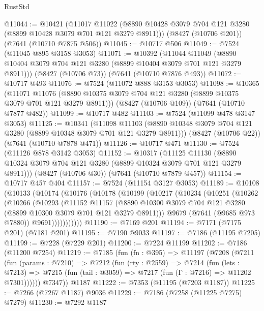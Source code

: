 \begin{lexlean}{RustStd}
\begin{coremodule}
{\begin{coremodule}
{{{{{{{{{{{{{{{{{{{{{{{{{{{{{{{{@11044 := @10421
    (@11017 @11022 (@8890 @10428 @3079 @704 @121 @3280 (@8899 @10428 @3079 @701 @121 @3279 @8911)))
    (@8427 (@10706 @201))
    (@7641 (@10710 @7875 @506))
@11045 := @10717 @506
@11049 := @7524 (@11045 @895 @3158 @3053)
@11071 := @10392
    (@11044 @11049 (@8890 @10404 @3079 @704 @121 @3280 (@8899 @10404 @3079 @701 @121 @3279 @8911)))
    (@8427 (@10706 @73))
    (@7641 (@10710 @7876 @493))
@11072 := @10717 @493
@11076 := @7524 (@11072 @888 @3153 @3053)
@11098 := @10365
    (@11071 @11076 (@8890 @10375 @3079 @704 @121 @3280 (@8899 @10375 @3079 @701 @121 @3279 @8911)))
    (@8427 (@10706 @109))
    (@7641 (@10710 @7877 @482))
@11099 := @10717 @482
@11103 := @7524 (@11099 @478 @3147 @3053)
@11125 := @10341
    (@11098 @11103 (@8890 @10348 @3079 @704 @121 @3280 (@8899 @10348 @3079 @701 @121 @3279 @8911)))
    (@8427 (@10706 @22))
    (@7641 (@10710 @7878 @471))
@11126 := @10717 @471
@11130 := @7524 (@11126 @878 @3142 @3053)
@11152 := @10317
    (@11125 @11130 (@8890 @10324 @3079 @704 @121 @3280 (@8899 @10324 @3079 @701 @121 @3279 @8911)))
    (@8427 (@10706 @30))
    (@7641 (@10710 @7879 @457))
@11154 := @10717 @457 @404
@11157 := @7524 (@11154 @3127 @3053)
@11189 := @10108
    (@10133
      (@10174
        (@10176
          (@10178
            (@10199
              (@10217
                (@10234
                  (@10251
                    (@10262
                      (@10266
                        (@10293
                          (@11152
                            @11157
                            (@8890
                              @10300
                              @3079
                              @704
                              @121
                              @3280
                              (@8899 @10300 @3079 @701 @121 @3279 @8911)))
                          @9679
                          (@7641 (@9685 @973 @7880))
                          @9691)))))))))))
@11190 := @7169 @201
@11194 := @7171 (@7175 @201) (@7181 @201)
@11195 := @7190 @9033
@11197 := @7186 (@11195 @7205)
@11199 := @7228 (@7229 @201)
@11200 := @7224 @11199
@11202 := @7186 (@11200 @7254)
@11219 := @7185
    (fun (fn : @395) =>
    @11197
      (@7208
        (@7211
          (fun (params : @7210) =>
          @7212
            (fun (rty : @2559) =>
            @7214
              (fun (lets : @7213) =>
              @7215 (fun (tail : @3059) => @7217 (fun (Γ : @7216) => @11202 @7301))))))
        @7347))
    @1187
@11222 := @7353 (@11195 (@7203 @1187))
@11225 := @7266 (@7267 @1187) @9036
@11229 := @7186 (@7258 (@11225 @7275) @7279)
@11230 := @7292 @1187
}}}}}}}}}}}}}}}}}}}}}}}}}}}}}}}}
\end{coremodule}}
\end{coremodule}
\end{lexlean}
